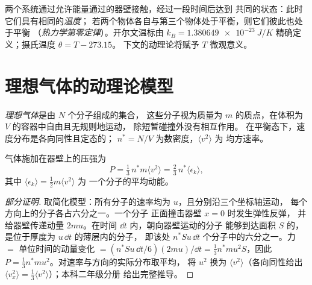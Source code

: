\begin{definition}[温度]\label{def:b1:kinetic-theory:temperature}
两个系统通过允许能量通过的器壁接触，经过一段时间后达到
共同的状态：此时它们具有相同的\emph{温度}；
若两个物体各自与第三个物体处于平衡，则它们彼此也处于平衡
（\emph{热力学第零定律}）。开尔文温标由
$k_B = \qty{1.380649e-23}{J/K}$ 精确定义；摄氏温度 $\theta = T - 273.15$。
下文的动理论将赋予 $T$ 微观意义。
\end{definition}

\section{理想气体的动理论模型}

\begin{definition}[理想气体的微观模型]\label{def:b1:kinetic-theory:model}
\emph{理想气体}是由 $N$ 个分子组成的集合，
这些分子视为质量为 $m$ 的质点，在体积为 $V$ 的容器中自由且无规则地运动，
除短暂碰撞外没有相互作用。
在平衡态下，速度分布是各向同性且定态的；
$n^* = N/V$ 为数密度，$\langle v^2\rangle$ 为
均方速率。
\end{definition}

\begin{theorem}[动理论压强]\label{thm:b1:kinetic-theory:pressure}
气体施加在器壁上的压强为
\[
P = \tfrac13\,n^*m\langle v^2\rangle = \tfrac23\,n^*\langle\epsilon_k\rangle ,
\]
其中 $\langle\epsilon_k\rangle = \tfrac12 m\langle v^2\rangle$ 为
一个分子的平均动能。
\end{theorem}

\begin{proof}[部分证明]
取简化模型：所有分子的速率均为 $u$，且分别沿三个坐标轴运动，
每个方向上的分子各占六分之一。一个分子
正面撞击器壁 $x = 0$ 时发生弹性反弹，
并给器壁传递动量 $2mu$。在时间 $\dd t$ 内，朝向器壁运动的分子
能够到达面积 $S$ 的，是位于厚度为 $u\,\dd t$ 的薄层内的分子，
即该处 $n^*Su\,\dd t$ 个分子中的六分之一。力 $= $
单位时间的动量变化 $= (n^*Su\,\dd t/6)(2mu)/\dd t = \tfrac13 n^*mu^2S$，因此
$P = \tfrac13 n^*mu^2$。对速率与方向的实际分布取平均，
将 $u^2$ 换为 $\langle v^2\rangle$（各向同性给出
$\langle v_x^2\rangle = \tfrac13\langle v^2\rangle$）；本科二年级分册
给出完整推导。
\end{proof}

